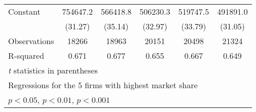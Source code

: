 {\begin{tabular}{l*{5}{c}}
Constant            &    754647.2\sym{***}&    566418.8\sym{***}&    506230.3\sym{***}&    519747.5\sym{***}&    491891.0\sym{***}\\
                    &     (31.27)         &     (35.14)         &     (32.97)         &     (33.79)         &     (31.05)         \\
\hline
Observations        &       18266         &       18963         &       20151         &       20498         &       21324         \\
R-squared           &       0.671         &       0.677         &       0.655         &       0.667         &       0.649         \\
\hline\hline
\multicolumn{6}{l}{\footnotesize \textit{t} statistics in parentheses}\\
\multicolumn{6}{l}{\footnotesize Regressions for the 5 firms with highest market share}\\
\multicolumn{6}{l}{\footnotesize \sym{*} \(p<0.05\), \sym{**} \(p<0.01\), \sym{***} \(p<0.001\)}\\
\end{tabular}
}
